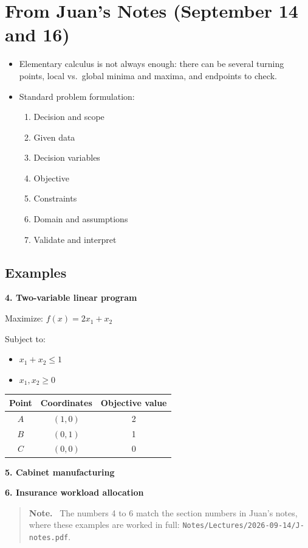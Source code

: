 \documentclass[11pt]{article}
\newenvironment{aside}{\begin{quote}\small\color{black!65}\textbf{Note.}\ }{\end{quote}}
\begin{document}
\section{From Juan's Notes (September 14 and 16)}

\begin{itemize}
    \item Elementary calculus is not always enough: there can be several turning
          points, local vs.\ global minima and maxima, and endpoints to check.
    \item Standard problem formulation:
    \begin{enumerate}
        \item Decision and scope
        \item Given data
        \item Decision variables
        \item Objective
        \item Constraints
        \item Domain and assumptions
        \item Validate and interpret
    \end{enumerate}
\end{itemize}

\subsection*{Examples}

\textbf{4. Two-variable linear program}

\begin{minipage}[t]{0.45\linewidth}
\vspace{0pt}
Maximize: $f(x) = 2x_1 + x_2$

Subject to:
\begin{itemize}
    \item $x_1 + x_2 \le 1$
    \item $x_1, x_2 \ge 0$
\end{itemize}
\end{minipage}\hfill
\begin{minipage}[t]{0.45\linewidth}
\vspace{0pt}
\centering
\begin{tabular}{ccc}
    \toprule
    Point & Coordinates & Objective value \\
    \midrule
    $A$ & $(1, 0)$ & 2 \\
    $B$ & $(0, 1)$ & 1 \\
    $C$ & $(0, 0)$ & 0 \\
    \bottomrule
\end{tabular}
\end{minipage}

\medskip
\textbf{5. Cabinet manufacturing}

\textbf{6. Insurance workload allocation}

\begin{aside}
The numbers 4 to 6 match the section numbers in Juan's notes, where these
examples are worked in full: \texttt{Notes/Lectures/2026-09-14/J-notes.pdf}.
\end{aside}
\end{document}
